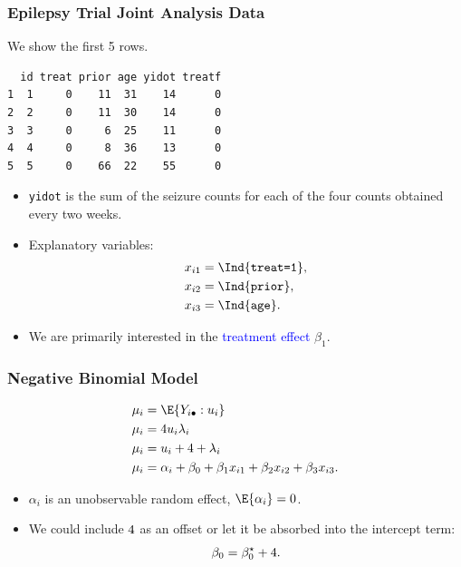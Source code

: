 \documentclass[oneside]{book}\usepackage[]{graphicx}\usepackage[svgnames]{xcolor}
\makeatletter
\newenvironment{kframe}{%
 \def\at@end@of@kframe{}%
 \ifinner\ifhmode%
  \def\at@end@of@kframe{\end{minipage}}%
  \begin{minipage}{\columnwidth}%
 \fi\fi%
 \def\FrameCommand##1{\hskip\@totalleftmargin \hskip-\fboxsep
 \colorbox{shadecolor}{##1}\hskip-\fboxsep
     \hskip-\linewidth \hskip-\@totalleftmargin \hskip\columnwidth}%
 \MakeFramed {\advance\hsize-\width
   \@totalleftmargin\z@ \linewidth\hsize
   \@setminipage}}%
 {\par\unskip\endMakeFramed%
 \at@end@of@kframe}
\newenvironment{knitrout}{}{} %
\providecommand\given{} %
\renewcommand\given{\nonscript\:\delimsize\vert\nonscript\:\mathopen{}}%
\renewcommand\given{\nonscript\:\delimsize\vert\nonscript\:\mathopen{}}%
\renewcommand\given{\nonscript\:\delimsize\vert\nonscript\:\mathopen{}}%
\renewcommand\given{\nonscript\:\delimsize\vert\nonscript\:\mathopen{}}%
\renewcommand\given{\nonscript\:\delimsize\vert\nonscript\:\mathopen{}}%
\renewcommand\given{\nonscript\:\delimsize\vert\nonscript\:\mathopen{}}%
\renewcommand\given{\nonscript\:\delimsize\vert\nonscript\:\mathopen{}}%
\renewcommand\given{\nonscript\:\delimsize\vert\nonscript\:\mathopen{}}%
\renewcommand\given{\nonscript\:\delimsize\vert\nonscript\:\mathopen{}}%
\renewcommand\given{\nonscript\:\delimsize\vert\nonscript\:\mathopen{}}%
\renewcommand\given{\nonscript\:\delimsize\vert\nonscript\:\mathopen{}}%
\renewcommand\given{\nonscript\:\delimsize\vert\nonscript\:\mathopen{}}%
\let\log\relax%
\renewcommand\given{:}
\makeatother
\begin{document}
\subsubsection*{Epilepsy Trial Joint Analysis Data}
\begin{Example}{}
    We show the first 5 rows.
\begin{knitrout}
\color{fgcolor}\begin{kframe}
\begin{verbatim}
  id treat prior age yidot treatf
1  1     0    11  31    14      0
2  2     0    11  30    14      0
3  3     0     6  25    11      0
4  4     0     8  36    13      0
5  5     0    66  22    55      0
\end{verbatim}
\end{kframe}
\end{knitrout}
\end{Example}
\begin{itemize}
    \item \texttt{yidot} is the sum of the seizure counts for each of the four counts obtained every two weeks.
    \item Explanatory variables:
          \begin{align*}
              x_{i1} & =\Ind{\texttt{treat=1}}, \\
              x_{i2} & =\Ind{\texttt{prior}},   \\
              x_{i3} & =\Ind{\texttt{age}}.
          \end{align*}
    \item We are primarily interested in the \textcolor{Blue}{treatment effect} $ \beta_1 $.
\end{itemize}
\subsubsection*{Negative Binomial Model}
\begin{align*}
    \mu_i       & =\E{Y_{i\bullet}\given u_i}                                  \\
    \mu_i       & =4u_i\lambda_i                                               \\
    \log{\mu_i} & =\log{u_i}+\log{4}+\log{\lambda_i}                           \\
    \log{\mu_i} & =\alpha_i+\beta_0+\beta_1x_{i1}+\beta_2x_{i2}+\beta_3x_{i3}.
\end{align*}
\begin{itemize}
    \item $ \alpha_i $ is an unobservable random effect, $ \E{\alpha_i}=0 $.
    \item We could include $ \log{4} $ as an offset or let it be absorbed into the intercept term:
          \[ \beta_0=\beta_0^\star +\log{4}. \]
\end{itemize}
\end{document}
